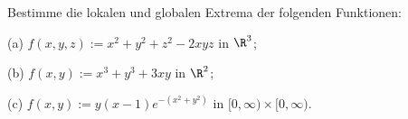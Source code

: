 \begin{prob}
Bestimme die lokalen und globalen Extrema der folgenden Funktionen:

(a) $f(x,y,z) := x^2+y^2+z^2-2xyz$ in $\R^3$;

(b) $f(x,y) := x^3+y^3+3xy$ in $\R^2$;

(c) $f(x,y) := y(x-1)e^{-(x^2+y^2)}$ in $[0,\infty)\times[0,\infty)$. 
\end{prob}
